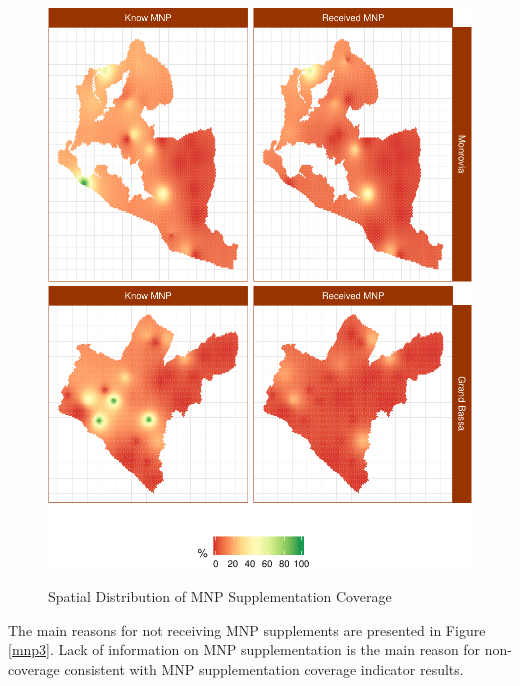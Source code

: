 \documentclass[12pt,a4paper]{article}
\theoremstyle{definition}
\theoremstyle{definition}
\theoremstyle{definition}
\theoremstyle{remark}
\begin{document}
\begin{figure}[H]

{\centering \includegraphics{liberiaCoverageReport_files/figure-latex/mnpMap-1} \includegraphics{liberiaCoverageReport_files/figure-latex/mnpMap-2} 

}

\caption{Spatial Distribution of MNP Supplementation Coverage}\label{fig:mnpMap}
\end{figure}

The main reasons for not receiving MNP supplements are presented in
Figure \ref{mnp3}. Lack of information on MNP supplementation is the
main reason for non-coverage consistent with MNP supplementation
coverage indicator results.
\end{document}
